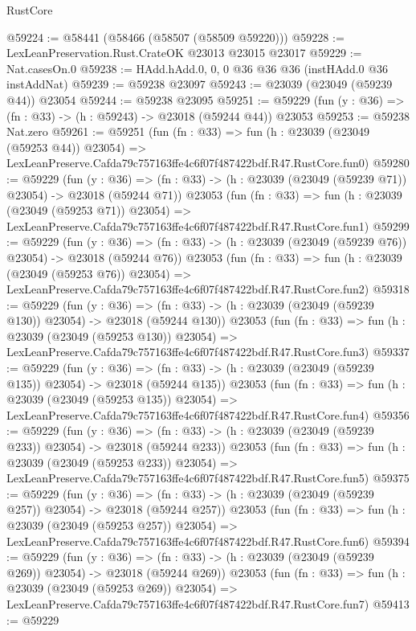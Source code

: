 \begin{lexlean}{RustCore}
\begin{coremodule}
@59224 := @58441 (@58466 (@58507 (@58509 @59220)))
@59228 := LexLeanPreservation.Rust.CrateOK @23013 @23015 @23017
@59229 := Nat.casesOn.{0}
@59238 := HAdd.hAdd.{0, 0, 0} @36 @36 @36 (instHAdd.{0} @36 instAddNat)
@59239 := @59238 @23097
@59243 := @23039 (@23049 (@59239 @44)) @23054
@59244 := @59238 @23095
@59251 := @59229 (fun (y : @36) => (fn : @33) -> (h : @59243) -> @23018 (@59244 @44)) @23053
@59253 := @59238 Nat.zero
@59261 := @59251
    (fun (fn : @33) =>
    fun (h : @23039 (@23049 (@59253 @44)) @23054) =>
    LexLeanPreserve.Cafda79c757163ffe4c6f07f487422bdf.R47.RustCore.fun0)
@59280 := @59229
    (fun (y : @36) =>
    (fn : @33) -> (h : @23039 (@23049 (@59239 @71)) @23054) -> @23018 (@59244 @71))
    @23053
    (fun (fn : @33) =>
    fun (h : @23039 (@23049 (@59253 @71)) @23054) =>
    LexLeanPreserve.Cafda79c757163ffe4c6f07f487422bdf.R47.RustCore.fun1)
@59299 := @59229
    (fun (y : @36) =>
    (fn : @33) -> (h : @23039 (@23049 (@59239 @76)) @23054) -> @23018 (@59244 @76))
    @23053
    (fun (fn : @33) =>
    fun (h : @23039 (@23049 (@59253 @76)) @23054) =>
    LexLeanPreserve.Cafda79c757163ffe4c6f07f487422bdf.R47.RustCore.fun2)
@59318 := @59229
    (fun (y : @36) =>
    (fn : @33) -> (h : @23039 (@23049 (@59239 @130)) @23054) -> @23018 (@59244 @130))
    @23053
    (fun (fn : @33) =>
    fun (h : @23039 (@23049 (@59253 @130)) @23054) =>
    LexLeanPreserve.Cafda79c757163ffe4c6f07f487422bdf.R47.RustCore.fun3)
@59337 := @59229
    (fun (y : @36) =>
    (fn : @33) -> (h : @23039 (@23049 (@59239 @135)) @23054) -> @23018 (@59244 @135))
    @23053
    (fun (fn : @33) =>
    fun (h : @23039 (@23049 (@59253 @135)) @23054) =>
    LexLeanPreserve.Cafda79c757163ffe4c6f07f487422bdf.R47.RustCore.fun4)
@59356 := @59229
    (fun (y : @36) =>
    (fn : @33) -> (h : @23039 (@23049 (@59239 @233)) @23054) -> @23018 (@59244 @233))
    @23053
    (fun (fn : @33) =>
    fun (h : @23039 (@23049 (@59253 @233)) @23054) =>
    LexLeanPreserve.Cafda79c757163ffe4c6f07f487422bdf.R47.RustCore.fun5)
@59375 := @59229
    (fun (y : @36) =>
    (fn : @33) -> (h : @23039 (@23049 (@59239 @257)) @23054) -> @23018 (@59244 @257))
    @23053
    (fun (fn : @33) =>
    fun (h : @23039 (@23049 (@59253 @257)) @23054) =>
    LexLeanPreserve.Cafda79c757163ffe4c6f07f487422bdf.R47.RustCore.fun6)
@59394 := @59229
    (fun (y : @36) =>
    (fn : @33) -> (h : @23039 (@23049 (@59239 @269)) @23054) -> @23018 (@59244 @269))
    @23053
    (fun (fn : @33) =>
    fun (h : @23039 (@23049 (@59253 @269)) @23054) =>
    LexLeanPreserve.Cafda79c757163ffe4c6f07f487422bdf.R47.RustCore.fun7)
@59413 := @59229

\end{coremodule}
\end{lexlean}
